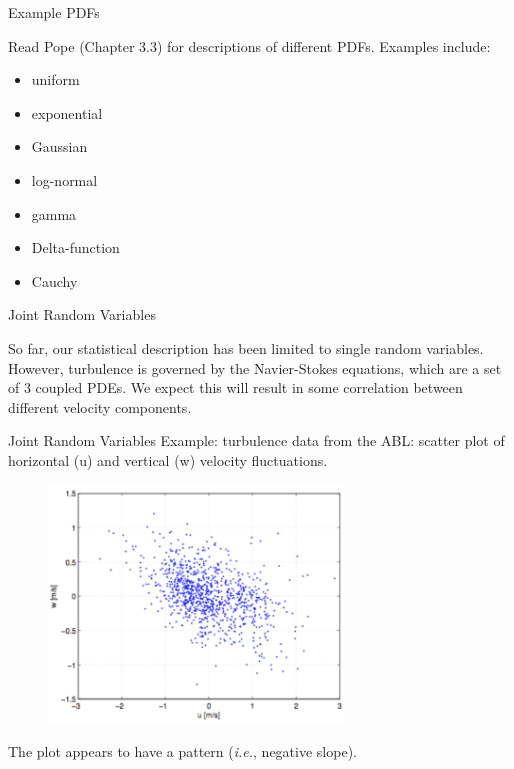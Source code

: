 
\begin{frame}{Example PDFs}

Read Pope (Chapter 3.3) for descriptions of different PDFs. \newline\newline Examples include:
\begin{itemize}
	\item uniform
	\item exponential
	\item Gaussian
	\item log-normal
	\item gamma
	\item Delta-function
	\item Cauchy
\end{itemize}

\end{frame}


\begin{frame}{Joint Random Variables}

So far, our statistical description has been limited to single random variables. However, turbulence is governed by the Navier-Stokes equations, which are a set of 3 coupled PDEs.\newline\newline
We expect this will result in some correlation between different velocity components.

\end{frame}


\begin{frame}{Joint Random Variables}
  Example: turbulence data from the ABL: scatter plot of horizontal (u) and vertical (w) velocity fluctuations.
  \begin{figure}[H]
  \centering
  \includegraphics[width=0.7\textwidth]{jr1.png}
  \end{figure}
  The plot appears to have a pattern (\textit{i.e.}, negative slope).
\end{frame}

